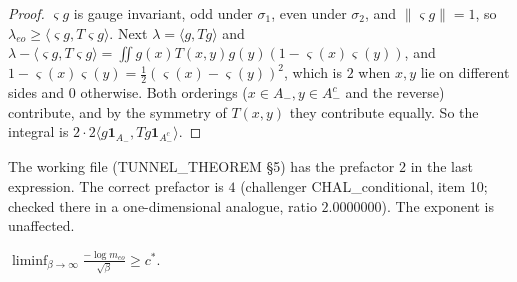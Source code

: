 \begin{proof}
$\varsigma g$ is gauge invariant, odd under $\sigma_1$, even under $\sigma_2$, and $\|\varsigma g\|=1$, so
$\lambda_{eo}\ge\langle\varsigma g,T\varsigma g\rangle$. Next $\lambda=\langle g,Tg\rangle$ and
$\lambda-\langle\varsigma g,T\varsigma g\rangle=\iint g(x)T(x,y)g(y)(1-\varsigma(x)\varsigma(y))$, and
$1-\varsigma(x)\varsigma(y)=\frac12(\varsigma(x)-\varsigma(y))^2$, which is $2$ when $x,y$ lie on different sides and $0$
otherwise. Both orderings ($x\in A_-,y\in A_-^c$ and the reverse) contribute, and by the symmetry of $T(x,y)$ they
contribute equally. So the integral is $2\cdot2\langle g\mathbf 1_{A_-},Tg\mathbf 1_{A_-^c}\rangle$.
\end{proof}

\begin{remark}
The working file (TUNNEL\_THEOREM \S5) has the prefactor $2$ in the last expression. The correct prefactor is $4$
(challenger CHAL\_conditional, item 10; checked there in a one-dimensional analogue, ratio $2.0000000$). The
exponent is unaffected.
\end{remark}

\begin{theorem}\label{tu:U-main}
$\displaystyle\liminf_{\beta\to\infty}\frac{-\log m_{eo}}{\sqrt\beta}\ge c^*$.
\end{theorem}

